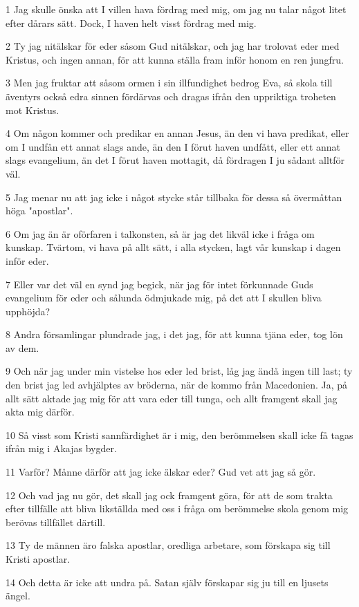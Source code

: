 \par 1 Jag skulle önska att I villen hava fördrag med mig, om jag nu talar något litet efter dårars sätt. Dock, I haven helt visst fördrag med mig.
\par 2 Ty jag nitälskar för eder såsom Gud nitälskar, och jag har trolovat eder med Kristus, och ingen annan, för att kunna ställa fram inför honom en ren jungfru.
\par 3 Men jag fruktar att såsom ormen i sin illfundighet bedrog Eva, så skola till äventyrs också edra sinnen fördärvas och dragas ifrån den uppriktiga troheten mot Kristus.
\par 4 Om någon kommer och predikar en annan Jesus, än den vi hava predikat, eller om I undfån ett annat slags ande, än den I förut haven undfått, eller ett annat slags evangelium, än det I förut haven mottagit, då fördragen I ju sådant alltför väl.
\par 5 Jag menar nu att jag icke i något stycke står tillbaka för dessa så övermåttan höga "apostlar".
\par 6 Om jag än är oförfaren i talkonsten, så är jag det likväl icke i fråga om kunskap. Tvärtom, vi hava på allt sätt, i alla stycken, lagt vår kunskap i dagen inför eder.
\par 7 Eller var det väl en synd jag begick, när jag för intet förkunnade Guds evangelium för eder och sålunda ödmjukade mig, på det att I skullen bliva upphöjda?
\par 8 Andra församlingar plundrade jag, i det jag, för att kunna tjäna eder, tog lön av dem.
\par 9 Och när jag under min vistelse hos eder led brist, låg jag ändå ingen till last; ty den brist jag led avhjälptes av bröderna, när de kommo från Macedonien. Ja, på allt sätt aktade jag mig för att vara eder till tunga, och allt framgent skall jag akta mig därför.
\par 10 Så visst som Kristi sannfärdighet är i mig, den berömmelsen skall icke få tagas ifrån mig i Akajas bygder.
\par 11 Varför? Månne därför att jag icke älskar eder? Gud vet att jag så gör.
\par 12 Och vad jag nu gör, det skall jag ock framgent göra, för att de som trakta efter tillfälle att bliva likställda med oss i fråga om berömmelse skola genom mig berövas tillfället därtill.
\par 13 Ty de männen äro falska apostlar, oredliga arbetare, som förskapa sig till Kristi apostlar.
\par 14 Och detta är icke att undra på. Satan själv förskapar sig ju till en ljusets ängel.
